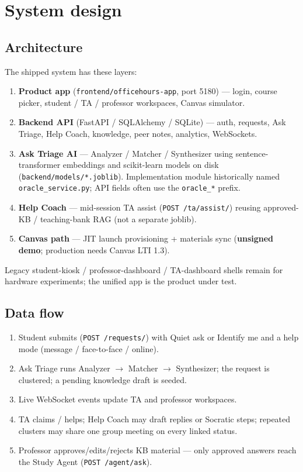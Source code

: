 \documentclass[11pt]{article}
\begin{document}
\section{System design}
\subsection{Architecture}
The shipped system has these layers:
\begin{enumerate}
  \item \textbf{Product app} (\texttt{frontend/officehours-app}, port 5180) ---
        login, course picker, student / TA / professor workspaces, Canvas simulator.
  \item \textbf{Backend API} (FastAPI / SQLAlchemy / SQLite) --- auth, requests,
        Ask Triage, Help Coach, knowledge, peer notes, analytics, WebSockets.
  \item \textbf{Ask Triage AI} --- Analyzer / Matcher / Synthesizer using
        sentence-transformer embeddings and scikit-learn models on disk
        (\texttt{backend/models/*.joblib}). Implementation module historically
        named \texttt{oracle\_service.py}; API fields often use the
        \texttt{oracle\_*} prefix.
  \item \textbf{Help Coach} --- mid-session TA assist (\texttt{POST /ta/assist/})
        reusing approved-KB / teaching-bank RAG (not a separate joblib).
  \item \textbf{Canvas path} --- JIT launch provisioning + materials sync
        (\textbf{unsigned demo}; production needs Canvas LTI 1.3).
\end{enumerate}

Legacy student-kiosk / professor-dashboard / TA-dashboard shells remain for
hardware experiments; the unified app is the product under test.

\subsection{Data flow}
\begin{enumerate}
  \item Student submits (\texttt{POST /requests/}) with Quiet ask or Identify me
        and a help mode (message / face-to-face / online).
  \item Ask Triage runs Analyzer $\rightarrow$ Matcher $\rightarrow$ Synthesizer;
        the request is clustered; a pending knowledge draft is seeded.
  \item Live WebSocket events update TA and professor workspaces.
  \item TA claims / helps; Help Coach may draft replies or Socratic steps;
        repeated clusters may share one group meeting on every linked status.
  \item Professor approves/edits/rejects KB material --- only approved answers
        reach the Study Agent (\texttt{POST /agent/ask}).
\end{enumerate}
\end{document}
